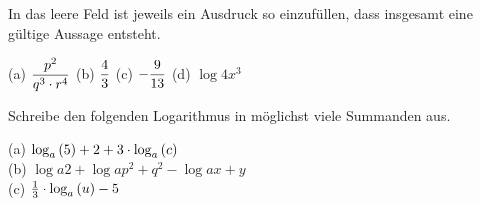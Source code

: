 \documentclass[11pt]{exam}
\begin{document}
\begin{questions}
\question[4]
In das leere Feld ist jeweils ein Ausdruck so einzufüllen, dass insgesamt eine gültige Aussage entsteht.
{\begin{solution}
		(a) $\displaystyle\frac{p^2}{q^3\cdot r^4}$ \qquad (b) $\displaystyle\frac{4}{3}$ \qquad (c) $\displaystyle-\frac{9}{13}$ \qquad (d) $\log{4}{x^3}$
\end{solution}}
{}


\question[6]
Schreibe den folgenden Logarithmus in möglichst viele Summanden aus.
{\begin{solution}
		(a) $\log{a}{5}+2+3\*\log{a}{c}$\\
		(b) $\log{a}{2}+\log{a}{p^2+q^2}-\log{a}{x+y}$\\
		(c) $\frac{1}{3}\*\log{a}{u}-5$
\end{solution}}
{}


\end{questions}
\end{document}
